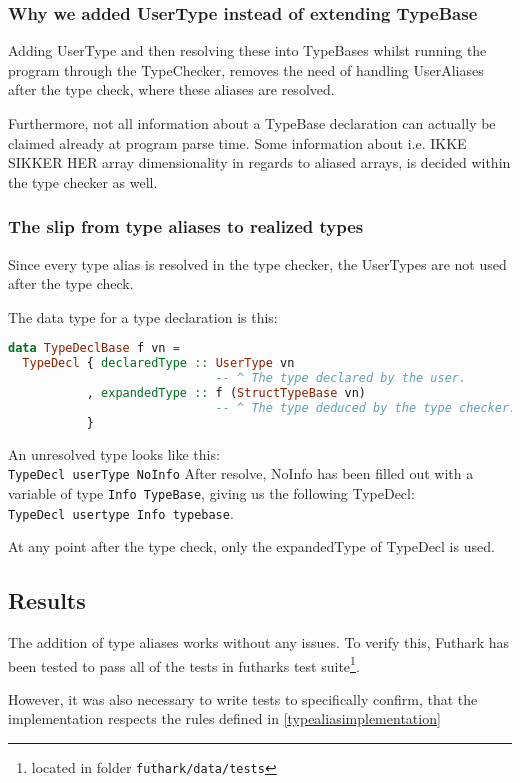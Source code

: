 \subsubsection{Why we added UserType instead of extending TypeBase}
Adding UserType and then resolving these into TypeBases whilst running the
program through the TypeChecker, removes the need of handling UserAliases after
the type check, where these aliases are resolved.

\label{typeclarification} Furthermore, not all information about a TypeBase declaration
can actually be claimed already at program parse time.
Some information about i.e. IKKE SIKKER HER array dimensionality in regards to aliased arrays, is decided within the type
checker as well. 

\subsubsection{The slip from type aliases to realized types}
Since every type alias is resolved in the type checker, the UserTypes are not
used after the type check.

The data type for a type declaration is this:
\begin{lstlisting}[language=Haskell]
data TypeDeclBase f vn =
  TypeDecl { declaredType :: UserType vn
                             -- ^ The type declared by the user.
           , expandedType :: f (StructTypeBase vn)
                             -- ^ The type deduced by the type checker.
           }
\end{lstlisting}

An unresolved type looks like this:\\
\indent \texttt{TypeDecl userType NoInfo}
After resolve, NoInfo has been filled out with a variable of type \texttt{Info
  TypeBase}, giving us the following TypeDecl:\\
\indent \texttt{TypeDecl usertype Info typebase}.

At any point after the type check, only the expandedType of TypeDecl is used.

\subsection{Results}
The addition of type aliases works without any issues.
To verify this, Futhark has been tested to pass all of the tests in futharks
test suite\footnote{located in folder \texttt{futhark/data/tests}}.

However, it was also necessary to write tests to specifically confirm, that the
implementation respects the rules defined in \ref{typealiasimplementation}

